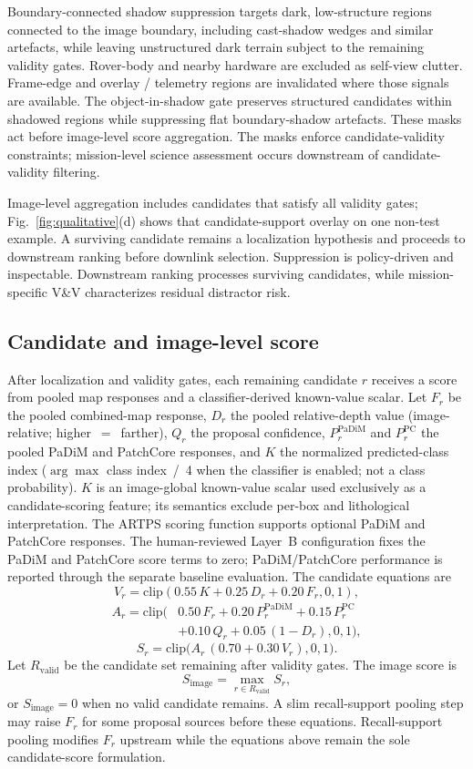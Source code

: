 Boundary-connected shadow suppression targets dark, low-structure regions connected to the
image boundary, including cast-shadow wedges and similar artefacts, while leaving unstructured
dark terrain subject to the remaining validity gates.
Rover-body and nearby hardware are excluded as self-view clutter.
Frame-edge and overlay / telemetry regions are invalidated where those signals are available.
The object-in-shadow gate preserves structured candidates within shadowed regions while
suppressing flat boundary-shadow artefacts.
These masks act before image-level score aggregation.
The masks enforce candidate-validity constraints; mission-level science assessment occurs
downstream of candidate-validity filtering.

Image-level aggregation includes candidates that satisfy all validity gates;
Fig.~\ref{fig:qualitative}(d) shows that candidate-support overlay on one non-test
example.
A surviving candidate remains a localization hypothesis and proceeds to downstream ranking
before downlink selection.
Suppression is policy-driven and inspectable.
Downstream ranking processes surviving candidates, while mission-specific V\&V characterizes
residual distractor risk.

\subsection{Candidate and image-level score}
After localization and validity gates, each remaining candidate \(r\) receives a score
from pooled map responses and a classifier-derived known-value scalar.
Let \(F_r\) be the pooled combined-map response,
\(D_r\) the pooled relative-depth value (image-relative; higher~$=$~farther),
\(Q_r\) the proposal confidence,
\(P^{\mathrm{PaDiM}}_r\) and \(P^{\mathrm{PC}}_r\) the pooled PaDiM and PatchCore responses,
and \(K\) the normalized predicted-class index
(\(\arg\max\) class index~/~4 when the classifier is enabled; not a class probability).
$K$ is an image-global known-value scalar used exclusively as a candidate-scoring feature;
its semantics exclude per-box and lithological interpretation.
The ARTPS scoring function supports optional PaDiM and PatchCore responses.
The human-reviewed Layer~B configuration fixes the PaDiM and PatchCore score terms to zero;
PaDiM/PatchCore performance is reported through the separate baseline evaluation.
The candidate equations are
\[
V_r=\mathrm{clip}(0.55\,K+0.25\,D_r+0.20\,F_r,0,1),
\]
\[
\begin{aligned}
A_r=\mathrm{clip}\bigl(&0.50\,F_r+0.20\,P^{\mathrm{PaDiM}}_r+0.15\,P^{\mathrm{PC}}_r\\
&+0.10\,Q_r+0.05\,(1-D_r),0,1\bigr),
\end{aligned}
\]
\[
S_r=\mathrm{clip}\bigl(A_r\,(0.70+0.30\,V_r),0,1\bigr).
\]
Let \(R_{\mathrm{valid}}\) be the candidate set remaining after validity gates.
The image score is
\[
S_{\mathrm{image}}=\max_{r\in R_{\mathrm{valid}}} S_r,
\]
or \(S_{\mathrm{image}}=0\) when no valid candidate remains.
A slim recall-support pooling step may raise \(F_r\) for some proposal sources before these
equations.
Recall-support pooling modifies \(F_r\) upstream while the equations above remain the sole
candidate-score formulation.

